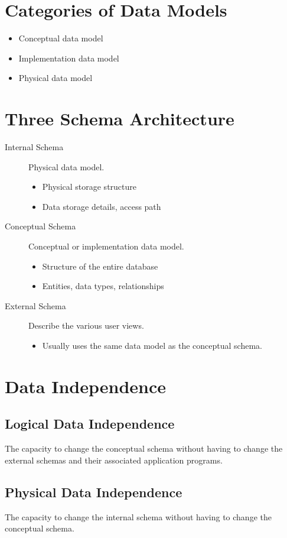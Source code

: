 \documentclass{article}
\begin{document}
\section{Categories of Data Models}
\begin{itemize}
\item Conceptual data model
\item Implementation data model
\item Physical data model
\end{itemize}

\section{Three Schema Architecture}
\begin{description}
\item[Internal Schema] Physical data model.
    \begin{itemize}
    \item Physical storage structure
    \item Data storage details, access path
    \end{itemize}
\item[Conceptual Schema] Conceptual or implementation data model.
    \begin{itemize}
    \item Structure of the entire database
    \item Entities, data types, relationships
    \end{itemize}
\item[External Schema] Describe the various user views.
    \begin{itemize}
    \item Usually uses the same data model as the conceptual schema.
    \end{itemize}
\end{description}

\section{Data Independence}
\subsection{Logical Data Independence}
The capacity to change the conceptual schema without having to change the external schemas and their associated application programs.

\subsection{Physical Data Independence}
The capacity to change the internal schema without having to change the conceptual schema.
\end{document}
